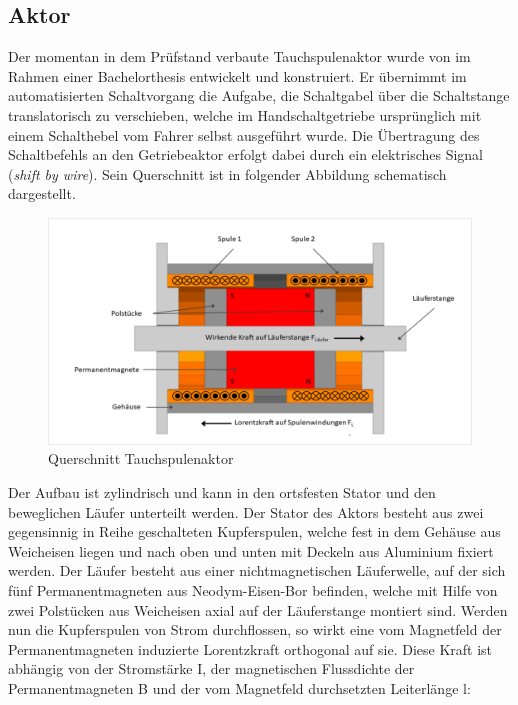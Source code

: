 \subsection{Aktor}

Der momentan in dem Prüfstand verbaute Tauchspulenaktor wurde von \cite{Hahn2018} im Rahmen einer Bachelorthesis entwickelt und konstruiert. Er übernimmt im automatisierten Schaltvorgang die Aufgabe, die Schaltgabel  über die Schaltstange translatorisch zu verschieben, welche im Handschaltgetriebe ursprünglich mit einem Schalthebel vom Fahrer selbst ausgeführt wurde. Die Übertragung des Schaltbefehls an den Getriebeaktor erfolgt dabei durch ein elektrisches Signal (\textit{shift by wire}).
Sein Querschnitt ist in folgender Abbildung schematisch dargestellt.

\begin{figure}[h]
	\centering
		\includegraphics{Bilder/QuerschnittAktor.pdf}
	\caption{Querschnitt Tauchspulenaktor \cite[S.30]{Hahn2018}}
	\label{fig:Querschnitt Aktor}
\end{figure} \noindent
Der Aufbau ist zylindrisch und kann in den ortsfesten Stator und den beweglichen Läufer unterteilt werden. Der Stator des Aktors besteht aus zwei gegensinnig in Reihe geschalteten Kupferspulen, welche fest in dem Gehäuse aus Weicheisen liegen und nach oben und unten mit Deckeln aus Aluminium fixiert werden. Der Läufer besteht aus einer nichtmagnetischen Läuferwelle, auf der sich fünf Permanentmagneten aus Neodym-Eisen-Bor befinden, welche mit Hilfe von zwei Polstücken aus Weicheisen axial auf der Läuferstange montiert sind. 
Werden nun die Kupferspulen von Strom durchflossen, so wirkt eine vom Magnetfeld der Permanentmagneten induzierte Lorentzkraft orthogonal auf sie. Diese Kraft ist abhängig von der Stromstärke I, der magnetischen Flussdichte der Permanentmagneten B und der vom Magnetfeld durchsetzten Leiterlänge l:
